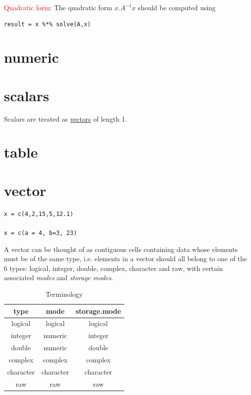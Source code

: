 \textcolor{red}{Quadratic form}: The quadratic form $x.A^{-1}x$ should
be computed using
\begin{lstlisting}
result = x %*% solve(A,x)
\end{lstlisting}


\section{numeric}
\label{sec:numeric}

\section{scalars}
\label{sec:scalars}

Scalars are treated as \hyperref[sec:vector]{vectors} of length 1.

\section{table}
\label{sec:table}

\section{vector}
\label{sec:vector}

\begin{lstlisting}
x = c(4,2,15,5,12.1)

x = c(a = 4, b=3, 23)
\end{lstlisting}

A vector can be thought of as contiguous cells containing data whose
elements must be of the same type, i.e. elements in a vector should
all belong to one of the 6 types: logical, integer, double, complex,
character and raw, with certain associated {\it modes} and
{\it storage modes}.

\begin{table}[hbt]
 \begin{center}
\caption{Terminology}
  \begin{tabular}{ccc}
    \hline
type & mode & storage.mode \\
    \hline\hline
logical & logical & logical \\
integer &  numeric & integer \\
double & numeric & double \\
complex & complex & complex \\ 
character & character & character \\
raw & raw & raw \\
  \end{tabular}
\end{center}
\label{tab:vector_prop}
\end{table}

